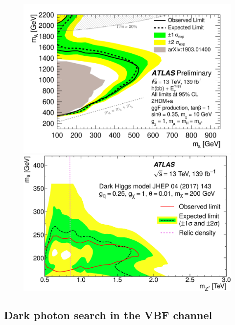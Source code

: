 \documentclass{moriond}
\begin{document}
\begin{figure} [htb]
\begin{minipage}{0.45\linewidth}
\centerline{\includegraphics[width=0.9\linewidth]{monoh}}
\end{minipage}
\begin{minipage}{0.45\linewidth}
\centerline{\includegraphics[width=0.9\linewidth]{monos}}
\end{minipage}
\caption[]{}
\label{fig:mono_h_s}
\end{figure}

\subsection{Dark photon search in the VBF channel}
\end{document}
